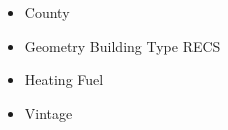 \begin{itemize}
\item County
\item Geometry Building Type RECS
\item Heating Fuel
\item Vintage
\end{itemize}
